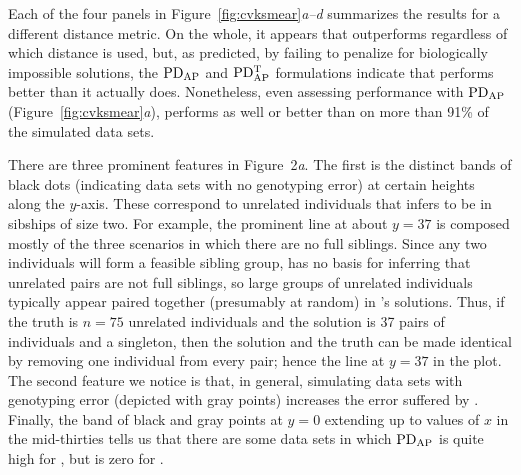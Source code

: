 Each of the four panels in Figure~\ref{fig:cvksmear}{\em a--d} summarizes the results for a different 
distance metric.  On the whole, it appears that \colony{} outperforms \kinalyzer{} regardless of which 
distance is used, but, as predicted, by failing to penalize for biologically impossible solutions, the 
$\mathrm{PD_{AP}}$ and $\mathrm{PD_{AP}^T}$ formulations indicate that \kinalyzer{} performs better than it actually does.   
Nonetheless, even assessing performance with $\mathrm{PD_{AP}}$ (Figure~\ref{fig:cvksmear}{\em a}), \colony{} 
performs as well or better than \kinalyzer{} on more than 91\% of the simulated data sets. 

There are three prominent features in Figure~2{\em a}.  The first is the distinct bands of black dots 
(indicating data sets with no genotyping error) at certain heights along the $y$-axis.  These 
correspond to unrelated individuals that \kinalyzer{} infers to be in sibships of size two.  For 
example, the prominent line at about $y=37$ is composed mostly of the three scenarios in which there 
are no full siblings. Since any two individuals will form a feasible sibling group, \kinalyzer{} has no 
basis for inferring that unrelated pairs are not full siblings, so large groups of unrelated 
individuals typically appear paired together (presumably at random) in \kinalyzer{}'s solutions.  Thus, 
if the truth is $n=75$ unrelated individuals and the \kinalyzer{} solution is 37 pairs of individuals 
and a singleton, then the \kinalyzer{} solution and the truth can be made identical by removing one 
individual from every pair; hence the line at $y=37$ in the plot. The second feature we notice is that, 
in general, simulating data sets with genotyping error (depicted with gray points) increases the error 
suffered by \kinalyzer{}.  Finally, the band of black and gray points at $y=0$ extending up to values 
of $x$ in the mid-thirties tells us that there are some data sets in which $\mathrm{PD_{AP}}$ is quite high for 
\colony{}, but is zero for \kinalyzer{}.  

